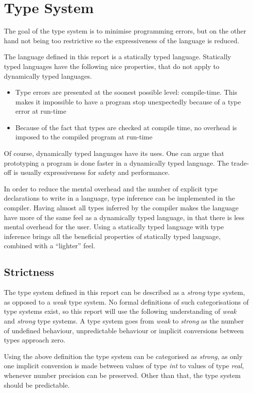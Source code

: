 \section{Type System}

The goal of the type system is to minimise programming errors, but on the other hand not being too restrictive so the expressiveness of the language is reduced. 

The language defined in this report is a statically typed language. Statically typed languages have the following nice properties, that do not apply to dynamically typed languages.

\begin{itemize}
  \item Type errors are presented at the soonest possible level: compile-time. This makes it impossible to have a program stop unexpectedly because of a type error at run-time
  \item Because of the fact that types are checked at compile time, no overhead is imposed to the compiled program at run-time
\end{itemize}

Of course, dynamically typed languages have its uses. One can argue that prototyping a program is done faster in a dynamically typed language. The trade-off is usually expressiveness for safety and performance.

In order to reduce the mental overhead and the number of explicit type declarations to write in a language, type inference can be implemented in the compiler. Having almost all types inferred by the compiler makes the language have more of the same feel as a dynamically typed language, in that there is less mental overhead for the user. Using a statically typed language with type inference brings all the beneficial properties of statically typed language, combined with a \enquote{lighter} feel.

\subsection{Strictness}

The type system defined in this report can be described as a \emph{strong} type system, as opposed to a \emph{weak} type system. No formal definitions of such categorisations of type systems exist, so this report will use the following understanding of \emph{weak} and \emph{strong} type systems. A type system goes from \emph{weak} to \emph{strong} as the number of undefined behaviour, unpredictable behaviour or implicit conversions between types approach zero.

Using the above definition the type system can be categorised as \emph{strong}, as only one implicit conversion is made between values of type \emph{int} to values of type \emph{real}, whenever number precision can be preserved. Other than that, the type system should be predictable.